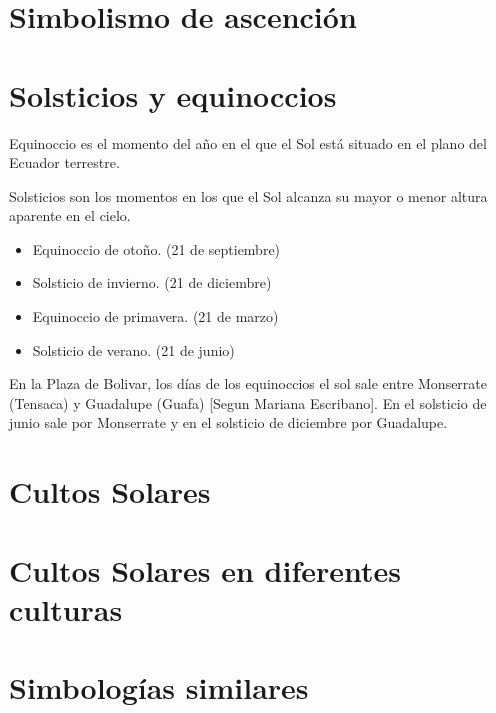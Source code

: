 \documentclass{report}
\begin{document}
\section*{Simbolismo de ascenci\'on}


\section*{Solsticios y equinoccios}

Equinoccio es el momento del a\~no en el que el Sol est\'a situado en
el plano del Ecuador terrestre.

Solsticios son los momentos en los que el Sol alcanza su mayor o menor
altura aparente en el cielo.

\begin{itemize}
\item Equinoccio de oto\~no. (21 de septiembre)
\item Solsticio de invierno. (21 de diciembre)
\item Equinoccio de primavera. (21 de marzo)
\item Solsticio de verano. (21 de junio)
\end{itemize}

En la Plaza de Bolivar, los d\'ias de los equinoccios el sol sale
entre Monserrate (Tensaca) y Guadalupe (Guafa) [Segun Mariana
  Escribano]. En el solsticio de junio sale por Monserrate y en el
solsticio de diciembre por Guadalupe. 

\section*{Cultos Solares}

\section*{Cultos Solares en diferentes culturas}

\section*{Simbolog\'ias similares}
\end{document}

